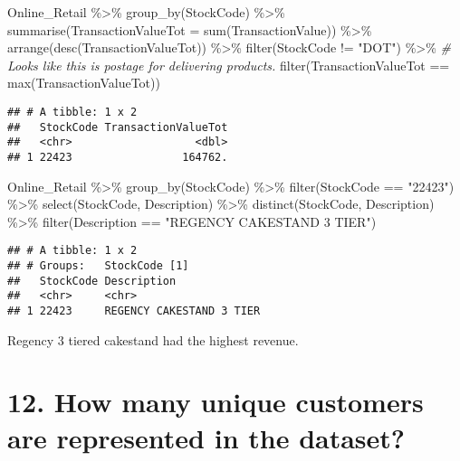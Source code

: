 \documentclass[
]{article}
\newenvironment{Shaded}{\begin{snugshade}}{\end{snugshade}}
\newcommand{\AttributeTok}[1]{\textcolor[rgb]{0.77,0.63,0.00}{#1}}
\newcommand{\CommentTok}[1]{\textcolor[rgb]{0.56,0.35,0.01}{\textit{#1}}}
\newcommand{\FunctionTok}[1]{\textcolor[rgb]{0.00,0.00,0.00}{#1}}
\newcommand{\NormalTok}[1]{#1}
\newcommand{\SpecialCharTok}[1]{\textcolor[rgb]{0.00,0.00,0.00}{#1}}
\newcommand{\StringTok}[1]{\textcolor[rgb]{0.31,0.60,0.02}{#1}}
\begin{document}
\begin{Shaded}
\begin{Highlighting}[]
\NormalTok{Online\_Retail }\SpecialCharTok{\%\textgreater{}\%}
  \FunctionTok{group\_by}\NormalTok{(StockCode) }\SpecialCharTok{\%\textgreater{}\%} 
  \FunctionTok{summarise}\NormalTok{(}\AttributeTok{TransactionValueTot =} \FunctionTok{sum}\NormalTok{(TransactionValue)) }\SpecialCharTok{\%\textgreater{}\%} 
  \FunctionTok{arrange}\NormalTok{(}\FunctionTok{desc}\NormalTok{(TransactionValueTot)) }\SpecialCharTok{\%\textgreater{}\%} 
  \FunctionTok{filter}\NormalTok{(StockCode }\SpecialCharTok{!=} \StringTok{"DOT"}\NormalTok{) }\SpecialCharTok{\%\textgreater{}\%}  \CommentTok{\# Looks like this is postage for delivering products.}
  \FunctionTok{filter}\NormalTok{(TransactionValueTot }\SpecialCharTok{==} \FunctionTok{max}\NormalTok{(TransactionValueTot))}
\end{Highlighting}
\end{Shaded}

\begin{verbatim}
## # A tibble: 1 x 2
##   StockCode TransactionValueTot
##   <chr>                   <dbl>
## 1 22423                 164762.
\end{verbatim}

\begin{Shaded}
\begin{Highlighting}[]
\NormalTok{Online\_Retail }\SpecialCharTok{\%\textgreater{}\%} 
  \FunctionTok{group\_by}\NormalTok{(StockCode) }\SpecialCharTok{\%\textgreater{}\%} 
  \FunctionTok{filter}\NormalTok{(StockCode }\SpecialCharTok{==} \StringTok{"22423"}\NormalTok{) }\SpecialCharTok{\%\textgreater{}\%} 
  \FunctionTok{select}\NormalTok{(StockCode, Description) }\SpecialCharTok{\%\textgreater{}\%} 
  \FunctionTok{distinct}\NormalTok{(StockCode, Description) }\SpecialCharTok{\%\textgreater{}\%} 
  \FunctionTok{filter}\NormalTok{(Description }\SpecialCharTok{==} \StringTok{"REGENCY CAKESTAND 3 TIER"}\NormalTok{)}
\end{Highlighting}
\end{Shaded}

\begin{verbatim}
## # A tibble: 1 x 2
## # Groups:   StockCode [1]
##   StockCode Description             
##   <chr>     <chr>                   
## 1 22423     REGENCY CAKESTAND 3 TIER
\end{verbatim}

Regency 3 tiered cakestand had the highest revenue.

\hypertarget{how-many-unique-customers-are-represented-in-the-dataset}{%
\section{12. How many unique customers are represented in the
dataset?}\label{how-many-unique-customers-are-represented-in-the-dataset}}
\end{document}

